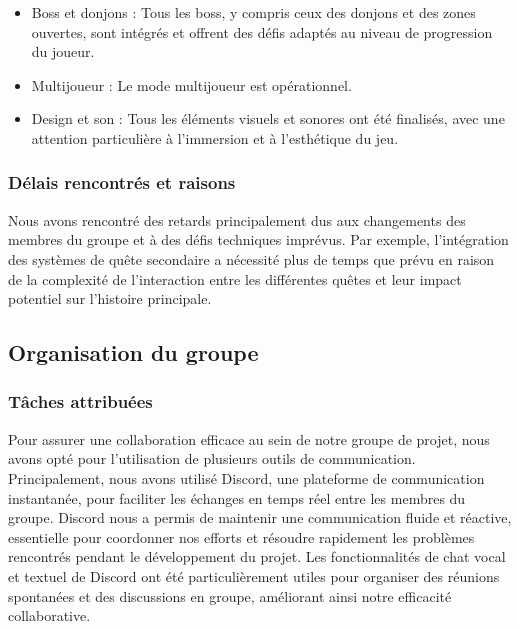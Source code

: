 \begin{itemize}
    \item Boss et donjons : Tous les boss, y compris ceux des donjons et des zones ouvertes, sont intégrés et offrent des défis adaptés au niveau de progression du joueur.
    \\

    \item Multijoueur : Le mode multijoueur est opérationnel.
    \\

    \item Design et son : Tous les éléments visuels et sonores ont été finalisés, avec une attention particulière à l'immersion et à l'esthétique du jeu.
    \\

\end{itemize}

\subsubsection*{Délais rencontrés et raisons}

Nous avons rencontré des retards principalement dus aux changements des membres du groupe et à des défis techniques imprévus. 
Par exemple, l'intégration des systèmes de quête secondaire a nécessité plus de temps que prévu en raison de la complexité de l'interaction entre les différentes quêtes et leur impact potentiel sur l'histoire principale.
\\

\subsection{Organisation du groupe}

\subsubsection{Tâches attribuées}

Pour assurer une collaboration efficace au sein de notre groupe de projet, nous avons opté pour l'utilisation de plusieurs outils de communication. 
Principalement, nous avons utilisé Discord, une plateforme de communication instantanée, pour faciliter les échanges en temps réel entre les membres du groupe. 
Discord nous a permis de maintenir une communication fluide et réactive, essentielle pour coordonner nos efforts et résoudre rapidement les problèmes rencontrés pendant le développement du projet. 
Les fonctionnalités de chat vocal et textuel de Discord ont été particulièrement utiles pour organiser des réunions spontanées et des discussions en groupe, améliorant ainsi notre efficacité collaborative.
\\

